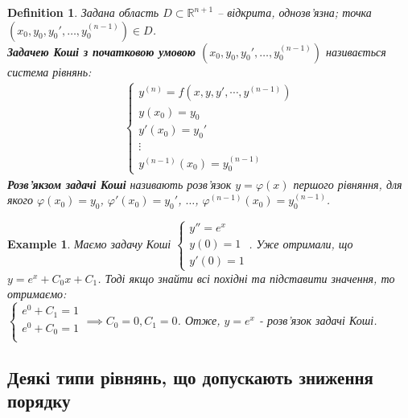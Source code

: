 \documentclass[a4paper, 10pt]{article}
\theoremstyle{theoremdd}
\theoremstyle{theoremdd}
\newtheorem{definition}[theorem]{Definition}
\theoremstyle{theoremdd}
\theoremstyle{theoremdd}
\newtheorem{example}[theorem]{Example}
\theoremstyle{theoremdd}
\theoremstyle{theoremdd}
\theoremstyle{theoremdd}
\theoremstyle{theoremdd}
\begin{document}
	\begin{definition}
 Задана область $D \! \subset \! \mathbb{R}^{n+1}$ -- відкрита, однозв'язна; точка $(x_0, y_0, y_0', \dots, y_0^{(n-1)}) \in D$.\\
	\textbf{Задачею Коші з початковою умовою} $(x_0, y_0, y_0', \dots, y_0^{(n-1)})$ називається система рівнянь:
	\begin{align*}
	\begin{cases}
	\displaystyle y^{(n)} = f(x,y,y',\cdots,y^{(n-1)})\\
	y(x_0)=y_0\\
	y'(x_0) = y_0'\\
	\vdots\\
	y^{(n-1)}(x_0) = y_0^{(n-1)}
	\end{cases}
	\end{align*}
	\textbf{Розв'якзом задачі Коші} називають розв'язок $y = \varphi(x)$ першого рівняння, для якого $\varphi(x_0)=y_0$, $\varphi'(x_0)=y_0'$, $\dots$, $\varphi^{(n-1)}(x_0)=y_0^{(n-1)}$.
	\end{definition}
	
	\begin{example}
	Маємо задачу Коші
 	$\begin{cases}
	y'' = e^x\\
	y(0) = 1\\
	y'(0) = 1
	\end{cases}$. Уже отримали, що $y = e^x + C_0 x + C_1$. Тоді якщо знайти всі похідні та підставити значення, то отримаємо:\\
	$\begin{cases}
	e^0 + C_1 = 1\\
	e^0 + C_0 = 1\\
	\end{cases} \implies C_0 = 0, C_1 = 0
	$. Отже, $y=e^x$ - розв'язок задачі Коші.
	\end{example}
	
	\subsection{Деякі типи рівнянь, що допускають зниження порядку}
\end{document}
